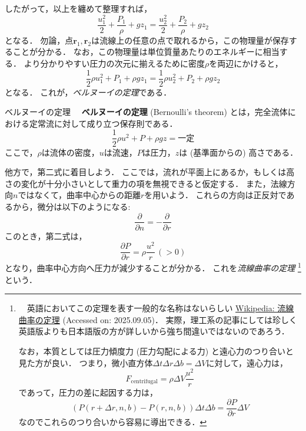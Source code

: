 \documentclass[uplatex,dvipdfmx,a4j,11pt]{jsreport}
\newcommand{\keyword}[1]{\textcolor{mainblue}{\textbf{#1}}}
\numberwithin{equation}{chapter}
\begin{document}
したがって，以上を纏めて整理すれば，
\begin{equation}
  \frac{u_1^2}{2} + \frac{P_1}{\rho} + gz_1 = \frac{u_2^2}{2} + \frac{P_2}{\rho} + gz_2
\end{equation}
となる．
勿論，点$\mathbf{r}_1, \mathbf{r}_2$は流線上の任意の点で取れるから，この物理量が保存することが分かる．
なお，この物理量は単位質量あたりのエネルギーに相当する．
より分かりやすい圧力の次元に揃えるために密度$\rho$を両辺にかけると，
\begin{equation}
  \frac{1}{2}\rho u_1^2 + P_1 + \rho gz_1 = \frac{1}{2}\rho u_2^2 + P_2 + \rho gz_2 
  \label{eq:bernoulli_equation}
\end{equation}
となる．
これが，\emph{ベルヌーイの定理}である．

\begin{definition}{ベルヌーイの定理}{}{}
  　\keyword{ベルヌーイの定理} (Bernoulli's theorem) とは，完全流体における定常流に対して成り立つ保存則である．
  \begin{equation}
    \frac{1}{2}\rho u^2 + P + \rho gz = \text{一定}
  \end{equation}
  ここで，$\rho$は流体の密度，$u$は流速，$P$は圧力，$z$は (基準面からの) 高さである． 
\end{definition}

他方で，第二式に着目しよう．
ここでは，流れが平面上にあるか，もしくは高さの変化が十分小さいとして重力の項を無視できると仮定する．
また，法線方向$n$ではなくて，曲率中心からの距離$r$を用いよう．
これらの方向は正反対であるから，微分は以下のようになる:
\begin{equation}
  \frac{\partial }{\partial n} = -\frac{\partial }{\partial r}
\end{equation}
このとき，第二式は，
\begin{equation*}
  \frac{\partial P}{\partial r} = \rho \frac{u^2}{r} \,(> 0)
\end{equation*}
となり，曲率中心方向へ圧力が減少することが分かる．
これを\emph{流線曲率の定理} 
\footnote{
  　英語においてこの定理を表す一般的な名称はないらしい
    \href{https://ja.wikipedia.org/wiki/\%E6\%B5\%81\%7B\%9A\%B2\%7E\%81\%AE\%5A\%E9\%A0\%9A\%7D}{Wikipedia: 流線曲率の定理} (Accessed on: 2025.09.05)．
  実際，理工系の記事にしては珍しく英語版よりも日本語版の方が詳しいから強ち間違いではないのであろう．

  なお，本質としては圧力傾度力 (圧力勾配による力) と遠心力のつり合いと見た方が良い．
  つまり，微小直方体$\Delta t \Delta r \Delta b = \Delta V$に対して，遠心力は，
  \begin{equation*}
    F_{\text{centrifugal}} = \rho \Delta V \frac{u^2}{r}
  \end{equation*}
  であって，圧力の差に起因する力は，
  \begin{equation*}
    \left(P(r + \Delta r, n, b) - P(r, n, b)\right) \Delta t \Delta b = \frac{\partial P}{\partial r} \Delta V
  \end{equation*}
  なのでこれらのつり合いから容易に導出できる．
}
という．
\end{document}
